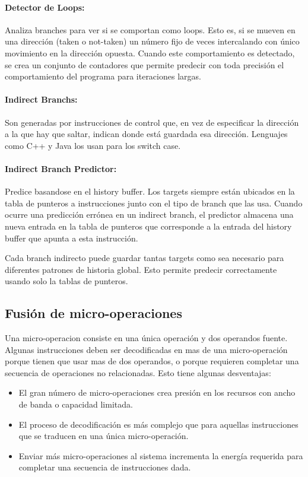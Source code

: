 \paragraph{Detector de Loops:} Analiza branches para ver si se comportan como loops. Esto es, si se mueven en una dirección (taken o not-taken) un número fijo de veces intercalando con único movimiento en la dirección opuesta. Cuando este comportamiento es detectado, se crea un conjunto de contadores que permite predecir con toda precisión el comportamiento del programa para iteraciones largas.

\paragraph{Indirect Branchs:} Son generadas por instrucciones de control que, en vez de especificar la dirección a la que hay que saltar, indican donde está guardada esa dirección. Lenguajes como C++ y Java los usan para los switch case.

\paragraph{Indirect Branch Predictor:} Predice basandose en el history buffer. Los targets siempre están ubicados en la tabla de punteros a instrucciones junto con el tipo de branch que las usa. Cuando ocurre una predicción errónea en un indirect branch, el predictor almacena una nueva entrada en la tabla de punteros que corresponde a la entrada del history buffer que apunta a esta instrucción.

Cada branch indirecto puede guardar tantas targets como sea necesario para diferentes patrones de historia global. Esto permite predecir correctamente usando solo la tablas de punteros.

\subsection{Fusión de micro-operaciones}
Una micro-operacion consiste en una única operación y dos operandos fuente. Algunas instrucciones deben ser decodificadas en mas de una micro-operación porque tienen que usar mas de dos operandos, o porque requieren completar una secuencia de operaciones no relacionadas. Esto tiene algunas desventajas:
\begin{itemize}
	\item El gran número de micro-operaciones crea presión en los recursos con  ancho de banda o capacidad limitada.
	
	\item El proceso de decodificación es más complejo que para aquellas instrucciones que se traducen en una única micro-operación.
	
	\item Enviar más micro-operaciones al sistema incrementa la energía requerida para completar una secuencia de instrucciones dada.
\end{itemize}

